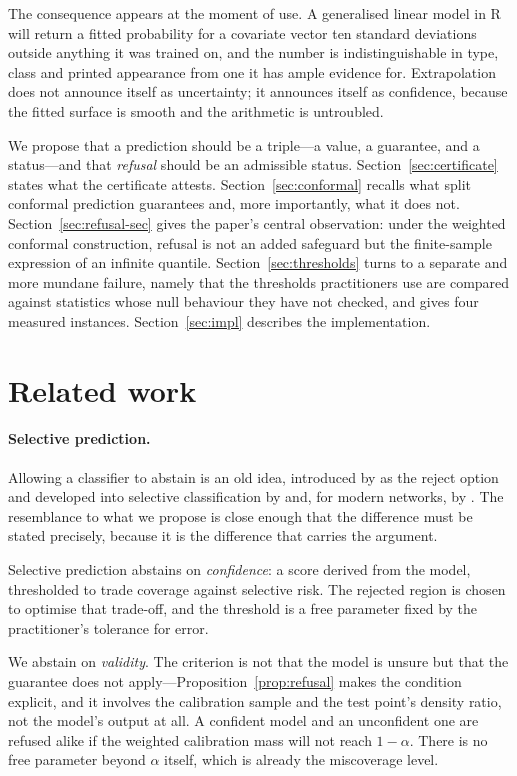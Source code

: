 \documentclass[11pt,a4paper]{article}
\theoremstyle{definition}
\begin{document}
The consequence appears at the moment of use. A generalised linear model in
\textsf{R} will return a fitted probability for a covariate vector ten standard
deviations outside anything it was trained on, and the number is
indistinguishable in type, class and printed appearance from one it has ample
evidence for. Extrapolation does not announce itself as uncertainty; it
announces itself as confidence, because the fitted surface is smooth and the
arithmetic is untroubled.

We propose that a prediction should be a triple---a value, a guarantee, and a
status---and that \emph{refusal} should be an admissible status.
Section~\ref{sec:certificate} states what the certificate attests.
Section~\ref{sec:conformal} recalls what split conformal prediction
guarantees and, more importantly, what it does not.
Section~\ref{sec:refusal-sec} gives
the paper's central observation: under the weighted conformal construction,
refusal is not an added safeguard but the finite-sample expression of an
infinite quantile. Section~\ref{sec:thresholds} turns to a separate and more
mundane failure,
namely that the thresholds practitioners use are compared against statistics
whose null behaviour they have not checked, and gives four measured instances.
Section~\ref{sec:impl} describes the implementation.

\section{Related work}

\paragraph{Selective prediction.} Allowing a classifier to abstain is an old
idea, introduced by \citet{chow1970} as the reject option and developed into
selective classification by \citet{elyaniv2010} and, for modern networks, by
\citet{geifman2017}. The resemblance to what we propose is close enough that
the difference must be stated precisely, because it is the difference that
carries the argument.

Selective prediction abstains on \emph{confidence}: a score derived from the
model, thresholded to trade coverage against selective risk. The rejected
region is chosen to optimise that trade-off, and the threshold is a free
parameter fixed by the practitioner's tolerance for error.

We abstain on \emph{validity}. The criterion is not that the model is unsure
but that the guarantee does not apply---Proposition~\ref{prop:refusal} makes
the condition explicit, and it involves the calibration sample and the test
point's density ratio, not the model's output at all. A confident model and an
unconfident one are refused alike if the weighted calibration mass will not
reach $1-\alpha$. There is no free parameter beyond $\alpha$ itself, which is
already the miscoverage level.
\end{document}
